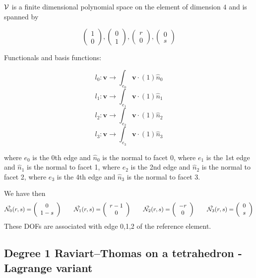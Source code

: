 ${\cal V}$ is a finite dimensional polynomial space on the element of dimension $4$ and is spanned by 

\[
\left( \begin{array}{c} 1 \\ 0  \end{array} \right),
\left( \begin{array}{c} 0 \\ 1  \end{array} \right),
\left( \begin{array}{c} r \\ 0  \end{array} \right),
\left( \begin{array}{c} 0 \\ s  \end{array} \right)
\]

Functionals and basis functions:

\[
l_0: {\bm v} \rightarrow \int_{e_0} {\bm v} \cdot (1) \hat{n}_0
\]
\[
l_1: {\bm v} \rightarrow \int_{e_1} {\bm v} \cdot (1) \hat{n}_1
\]
\[
l_2: {\bm v} \rightarrow \int_{e_2} {\bm v} \cdot (1) \hat{n}_2
\]
\[
l_3: {\bm v} \rightarrow \int_{e_3} {\bm v} \cdot (1) \hat{n}_3
\]


where $e_0$ is the 0th edge and $\hat{n}_0$ is the normal to facet 0,
where $e_1$ is the 1st edge and $\hat{n}_1$ is the normal to facet 1,
where $e_2$ is the 2nd edge and $\hat{n}_2$ is the normal to facet 2,
where $e_3$ is the 4th edge and $\hat{n}_3$ is the normal to facet 3.


We have then
\[
\vec{{\mathcal{N}}}_0(r,s) = \left( \begin{array}{c} 0 \\ 1-s  \end{array} \right)
\qquad
\vec{{\mathcal{N}}}_1(r,s) = \left( \begin{array}{c} r-1 \\0  \end{array} \right)
\qquad
\vec{{\mathcal{N}}}_2(r,s) = \left( \begin{array}{c} -r \\ 0  \end{array} \right)
\qquad
\vec{{\mathcal{N}}}_3(r,s) = \left( \begin{array}{c} 0 \\s  \end{array} \right)
\]
These DOFs are associated with edge 0,1,2 of the reference element.


\subsection{Degree 1 Raviart–Thomas on a tetrahedron - Lagrange variant}


